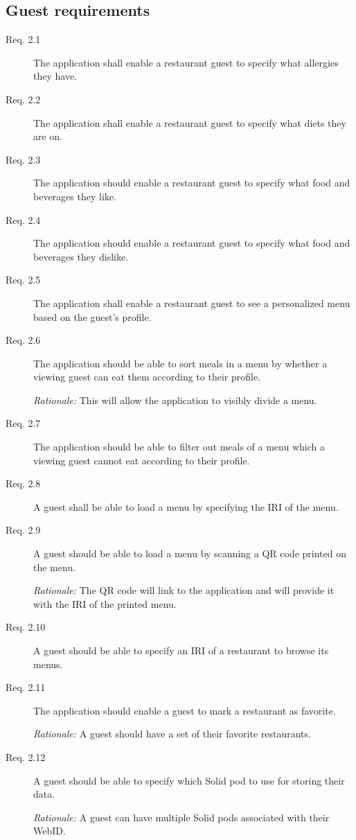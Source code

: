 \subsection{Guest requirements}
\begin{description}
    \item [Req. 2.1] The application shall enable a restaurant guest to specify what allergies they have.
    \item [Req. 2.2] The application shall enable a restaurant guest to specify what diets they are on.
    \item [Req. 2.3] The application should enable a restaurant guest to specify what food and beverages they like.
    \item [Req. 2.4] The application should enable a restaurant guest to specify what food and beverages they dislike.
    \item [Req. 2.5] The application shall enable a restaurant guest to see a personalized menu based on the guest's profile.
    \item [Req. 2.6] The application should be able to sort meals in a menu by whether a viewing guest can eat them according to their profile.

    \emph{Rationale:} This will allow the application to visibly divide a menu.
    \item [Req. 2.7] The application should be able to filter out meals of a menu which a viewing guest cannot eat according to their profile.
    \item [Req. 2.8] A guest shall be able to load a menu by specifying the IRI of the menu.
    \item [Req. 2.9] A guest should be able to load a menu by scanning a QR code printed on the menu.

    \emph{Rationale:} The QR code will link to the application and will provide it with the IRI of the printed menu.
    \item [Req. 2.10] A guest should be able to specify an IRI of a restaurant to browse its menus.
    \item [Req. 2.11] The application should enable a guest to mark a restaurant as favorite.
    
    \emph{Rationale:} A guest should have a set of their favorite restaurants.
    \item [Req. 2.12] A guest should be able to specify which Solid pod to use for storing their data.

    \emph{Rationale:} A guest can have multiple Solid pods associated with their WebID.
\end{description}

